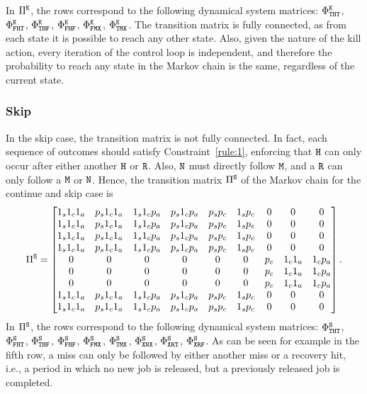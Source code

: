 In $\Pi^{\texttt{K}}$, the rows correspond to the following dynamical system matrices: $\Phi^{\texttt{K}}_{\texttt{T}\texttt{H}\texttt{T}}$, $\Phi^{\texttt{K}}_{\texttt{F}\texttt{H}\texttt{T}}$, $\Phi^{\texttt{K}}_{\texttt{T}\texttt{H}\texttt{F}}$, $\Phi^{\texttt{K}}_{\texttt{F}\texttt{H}\texttt{F}}$, $\Phi^{\texttt{K}}_{\texttt{F}\texttt{M}\texttt{X}}$, $\Phi^{\texttt{K}}_{\texttt{T}\texttt{M}\texttt{X}}$.
The transition matrix is fully connected, as from each state it is possible to reach any other state.
Also, given the nature of the kill action, every iteration of the control loop is independent, and therefore the probability to reach any state in the Markov chain is the same, regardless of the current state.

\subsubsection*{Skip}
In the skip case, the transition matrix is not fully connected.
In fact, each sequence of outcomes should satisfy Constraint~\ref{rule:1}, enforcing that $\texttt{H}$ can only occur after either another $\texttt{H}$ or $\texttt{R}$.
Also, $\texttt{N}$ must directly follow $\texttt{M}$, and a $\texttt{R}$ can only follow a $\texttt{M}$ or $\texttt{N}$.
Hence, the transition matrix $\Pi^{\texttt{S}}$ of the Markov chain for the continue and skip case is
\begin{equation}
\label{eq:piskip}
\Pi^{\Skip} = \begin{bmatrix}
            1_s1_c1_a & p_s1_c1_a & 1_s1_cp_a & p_s1_cp_a & p_sp_c & 1_sp_c & 0 & 0 & 0 \\
            1_s1_c1_a & p_s1_c1_a & 1_s1_cp_a & p_s1_cp_a & p_sp_c & 1_sp_c & 0 & 0 & 0 \\
            1_s1_c1_a & p_s1_c1_a & 1_s1_cp_a & p_s1_cp_a & p_sp_c & 1_sp_c & 0 & 0 & 0 \\
            1_s1_c1_a & p_s1_c1_a & 1_s1_cp_a & p_s1_cp_a & p_sp_c & 1_sp_c & 0 & 0 & 0 \\
            0 & 0 & 0 & 0 & 0 & 0 & p_c & 1_c1_a & 1_cp_a \\
            0 & 0 & 0 & 0 & 0 & 0 & p_c & 1_c1_a & 1_cp_a \\
            0 & 0 & 0 & 0 & 0 & 0 & p_c & 1_c1_a & 1_cp_a \\
            1_s1_c1_a & p_s1_c1_a & 1_s1_cp_a & p_s1_cp_a & p_sp_c & 1_sp_c & 0 & 0 & 0 \\
            1_s1_c1_a & p_s1_c1_a & 1_s1_cp_a & p_s1_cp_a & p_sp_c & 1_sp_c & 0 & 0 & 0 \\
\end{bmatrix}.
\end{equation}
In $\Pi^{\texttt{S}}$, the rows correspond to the following dynamical system matrices: $\Phi^{\texttt{S}}_{\texttt{T}\texttt{H}\texttt{T}}$, $\Phi^{\texttt{S}}_{\texttt{F}\texttt{H}\texttt{T}}$, $\Phi^{\texttt{S}}_{\texttt{T}\texttt{H}\texttt{F}}$, $\Phi^{\texttt{S}}_{\texttt{F}\texttt{H}\texttt{F}}$, $\Phi^{\texttt{S}}_{\texttt{F}\texttt{M}\texttt{X}}$, $\Phi^{\texttt{S}}_{\texttt{T}\texttt{M}\texttt{X}}$, $\Phi^{\texttt{S}}_{\texttt{X}\texttt{N}\texttt{X}}$, $\Phi^{\texttt{S}}_{\texttt{X}\texttt{R}\texttt{T}}$, $\Phi^{\texttt{S}}_{\texttt{X}\texttt{R}\texttt{F}}$.
As can be seen for example in the fifth row, a miss can only be followed by either another miss or a recovery hit, i.e., a period in which no new job is released, but a previously released job is completed.
 
